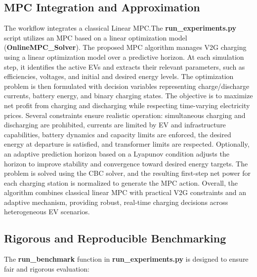 \subsection{MPC Integration and Approximation}

The workflow integrates a classical Linear MPC.The \textbf{run\_experiments.py} script utilizes an MPC based on a linear optimization model (\textbf{OnlineMPC\_Solver}).
The proposed MPC algorithm manages V2G charging using a linear optimization model over a predictive horizon. At each simulation step, it identifies the active EVs and extracts their relevant parameters, such as efficiencies, voltages, and initial and desired energy levels. The optimization problem is then formulated with decision variables representing charge/discharge currents, battery energy, and binary charging states. The objective is to maximize net profit from charging and discharging while respecting time-varying electricity prices.
Several constraints ensure realistic operation: simultaneous charging and discharging are prohibited, currents are limited by EV and infrastructure capabilities, battery dynamics and capacity limits are enforced, the desired energy at departure is satisfied, and transformer limits are respected. Optionally, an adaptive prediction horizon based on a Lyapunov condition adjusts the horizon to improve stability and convergence toward desired energy targets.
The problem is solved using the CBC solver, and the resulting first-step net power for each charging station is normalized to generate the MPC action. Overall, the algorithm combines classical linear MPC with practical V2G constraints and an adaptive mechanism, providing robust, real-time charging decisions across heterogeneous EV scenarios.
    
 
\subsection{Rigorous and Reproducible Benchmarking}

The \textbf{run\_benchmark} function in \textbf{run\_experiments.py} is designed to ensure fair and rigorous evaluation:

